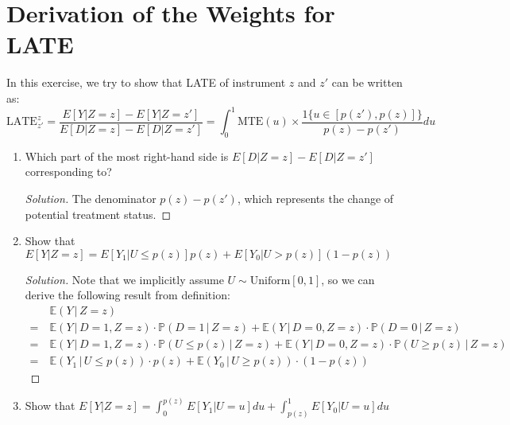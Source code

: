 \documentclass[11pt]{article}
\newenvironment{solution}{%
  \renewcommand\qedsymbol{$\blacksquare$}%
  \begin{mdframed}[backgroundcolor=gray!15]%
  \begin{proof}[Solution]}%
  {\end{proof}%
  \end{mdframed}}%
\newcommand{\ept}{\mathbb{E}}
\newcommand{\pr}{\mathbb{P}}
\newcommand{\given}{\,|\,}
\begin{document}
\section{Derivation of the Weights for LATE}

    In this exercise, we try to show that LATE of instrument \( z \) and \( z' \) can be written as:
    \[ \text{LATE}_{z'}^{z} = \frac{E[Y|Z=z] - E[Y|Z=z']}{E[D|Z=z] - E[D|Z=z']} = \int_{0}^{1} \text{MTE}(u) \times \frac{1\{u \in [p(z'),p(z)]\}}{p(z) - p(z')} du \]

    \begin{enumerate}

        \item Which part of the most right-hand side is \( E[D|Z=z] - E[D|Z=z'] \) corresponding to?
        
            \begin{solution}
                The denominator $p(z) - p(z')$, which represents the change of potential treatment status.
            \end{solution}

        \item Show that \( E[Y|Z=z] = E[Y_1|U \leq p(z)]p(z) + E[Y_0|U > p(z)](1 - p(z)) \)
        
            \begin{solution}
                Note that we implicitly assume $U \sim \text{Uniform}[0,1]$, so we can derive the following result from definition:
                \[ \begin{aligned}
                    &\ept(Y \given Z=z) \\
                    =\ & \ept(Y \given D=1, Z=z) \cdot \pr(D=1 \given Z=z) + \ept(Y \given D=0, Z=z) \cdot \pr(D=0 \given Z=z) \\
                    =\ & \ept(Y \given D=1, Z=z) \cdot \pr(U \leq p(z) \given Z=z) + \ept(Y \given D=0, Z=z) \cdot \pr(U \geq p(z) \given Z=z) \\
                    =\ & \ept(Y_1 \given U \leq p(z)) \cdot p(z) + \ept(Y_0 \given U \geq p(z)) \cdot (1-p(z))
                \end{aligned} \]
            \end{solution}
        
        \item Show that \( E[Y|Z=z] = \int_{0}^{p(z)} E[Y_1|U = u] du + \int_{p(z)}^{1} E[Y_0|U = u] du \)
        

\end{enumerate}
\end{document}
